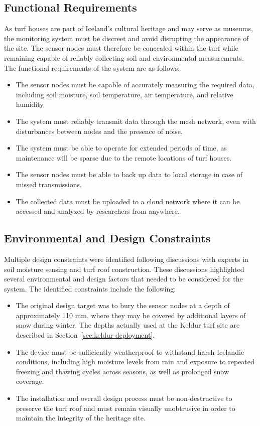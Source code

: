 \par

\subsection{Functional
Requirements}


As turf houses are part of Iceland's cultural heritage and may serve as museums, the monitoring system must be discreet and avoid disrupting the appearance of the site. The sensor nodes must therefore be concealed within the turf while remaining capable of reliably collecting soil and environmental measurements. The functional requirements of the system are as follows:

\begin{itemize}
\item
  The sensor nodes must be capable of accurately measuring the required
  data, including soil moisture, soil temperature, air temperature, and
  relative humidity.
\item
  The system must reliably transmit data through the mesh network, even
  with disturbances between nodes and the presence of noise.
\item
  The system must be able to operate for extended periods of time, as
  maintenance will be sparse due to the remote locations of turf houses.
\item
  The sensor nodes must be able to back up data to local storage in case
  of missed transmissions.
\item
  The collected data must be uploaded to a cloud network where it can be
  accessed and analyzed by researchers from anywhere.
\end{itemize}

\subsection{Environmental and Design
Constraints}


Multiple design constraints were identified following discussions with
experts in soil moisture sensing and turf roof construction. These
discussions highlighted several environmental and design factors that
needed to be considered for the system. The identified constraints
include the following:


\begin{itemize}
\item
  The original design target was to bury the sensor nodes at a depth of approximately 110 mm, where they may be covered by additional layers of snow during winter. The depths actually used at the Keldur turf site are described in Section~\ref{sec:keldur-deployment}.
\item
  The device must be sufficiently weatherproof to withstand harsh
  Icelandic conditions, including high moisture levels from rain and
  exposure to repeated freezing and thawing cycles across seasons, as
  well as prolonged snow coverage.
\item
  The installation and overall design process must be non-destructive to
  preserve the turf roof and must remain visually unobtrusive in order
  to maintain the integrity of the heritage site.
\end{itemize}

